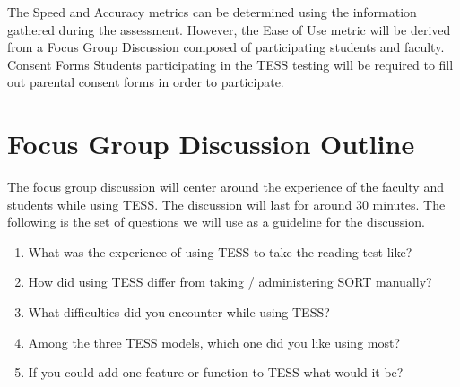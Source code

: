 The Speed and Accuracy metrics can be determined using the information gathered during the assessment. However, the Ease of Use metric will be derived from a Focus Group Discussion composed of participating students and faculty.
Consent Forms
Students participating in the TESS testing will be required to fill out parental consent forms in order to participate. 

\section{Focus Group Discussion Outline}
The focus group discussion will center around the experience of the faculty and students while using TESS. The discussion will last for around 30 minutes. The following is the set of questions we will use as a guideline for the discussion. 

\begin{enumerate}
\item What was the experience of using TESS to take the reading test like?
\item How did using TESS differ from taking / administering SORT manually?
\item What difficulties did you encounter while using TESS?
\item Among the three TESS models, which one did you like using most?
\item If you could add one feature or function to TESS what would it be?
\end{enumerate}
